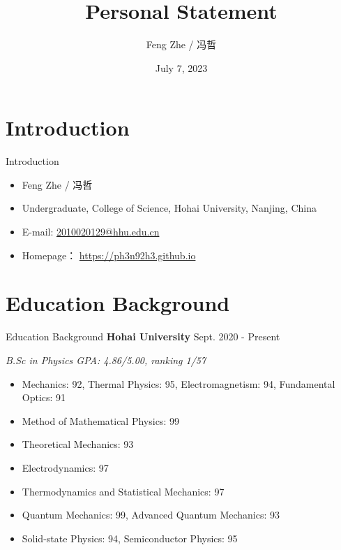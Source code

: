 \documentclass[9pt,aspectratio=169,hyperref=colorlinks]{beamer}
\title{Personal Statement}
\institute{College of Science, Hohai University}
\author{Feng Zhe / 冯哲}
\date{July 7, 2023}
\begin{document}
\frame{\titlepage}

\section{Introduction}
\begin{frame}{Introduction}
    \begin{itemize}
        \item Feng Zhe / 冯哲
        \item Undergraduate, College of Science, Hohai University, Nanjing, China
        \item E-mail: \href{mailto:2010020129@hhu.edu.cn}{2010020129@hhu.edu.cn}
        \item Homepage： \href{https://ph3n92h3.github.io}{https://ph3n92h3.github.io}
    \end{itemize}
\end{frame}

\section{Education Background}
\begin{frame}{Education Background}
    \textbf{Hohai University} \hfill Sept. 2020 - Present

    \textit{B.Sc in Physics \hfill GPA: 4.86/5.00, ranking 1/57}

    \begin{itemize}
        \item Mechanics: 92, Thermal Physics: 95, Electromagnetism: 94, Fundamental Optics: 91
        \item Method of Mathematical Physics: 99
        \item Theoretical Mechanics: 93
        \item Electrodynamics: 97
        \item Thermodynamics and Statistical Mechanics: 97
        \item Quantum Mechanics: 99, Advanced Quantum Mechanics: 93
        \item Solid-state Physics: 94, Semiconductor Physics: 95
    \end{itemize}
\end{frame}
\end{document}
